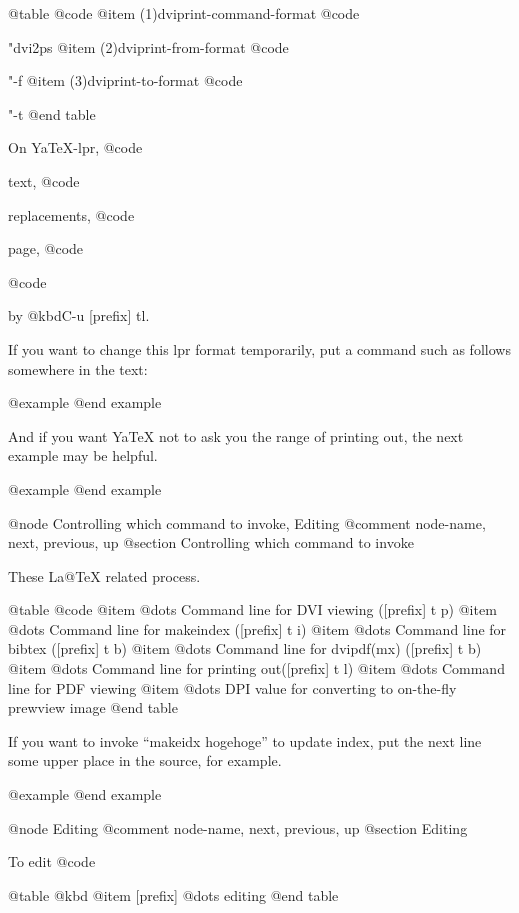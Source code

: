{{{{{{{{{{{{{{@table @code
@item (1)dviprint-command-format
        @code{"dvi2ps %
@item (2)dviprint-from-format
        @code{"-f %
@item (3)dviprint-to-format
        @code{"-t %
@end table

  On YaTeX-lpr, @code{%
text, @code{%
replacements, @code{%
page, @code{%
@code{%
by @kbd{C-u [prefix] tl}.

  If you want to change this lpr format temporarily, put a command
such as follows somewhere in the text:

@example
@end example

  And if you want YaTeX not to ask you the range of printing
out, the next example may be helpful.

@example
@end example

@node Controlling which command to invoke, Editing %
@comment  node-name,  next,  previous,  up
@section Controlling which command to invoke

These %
La@TeX{} related process.

@table @code
 @item %
	@dots{} Command line for DVI viewing ([prefix] t p)
 @item %
	@dots{} Command line for makeindex ([prefix] t i)
 @item %
	@dots{} Command line for bibtex ([prefix] t b)
 @item %
	@dots{} Command line for dvipdf(mx) ([prefix] t b)
 @item %
	@dots{} Command line for printing out([prefix] t l)
 @item %
	@dots{} Command line for PDF viewing
 @item %
	@dots{} DPI value for converting to on-the-fly prewview image
@end table

If you want to invoke ``makeidx hogehoge'' to update index,
put the next line some upper place in the source, for example.

@example
@end example


@node Editing %
@comment  node-name,  next,  previous,  up
@section Editing %

  To edit @code{%

@table @kbd
@item [prefix] %
        @dots{} editing %
@end table

}}}}}}}}}}}}}}}}}}}}}}}
